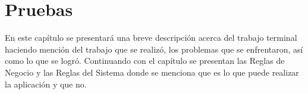 \chapter{Pruebas}

	\noindent En este capítulo se presentará una breve descripción acerca del trabajo terminal haciendo mención del trabajo que se realizó, los problemas que se enfrentaron, así como lo que se logró. Continuando con el capítulo se presentan las Reglas de Negocio y las Reglas del Sistema donde se menciona que es lo que puede realizar la aplicación y que no.\\
	